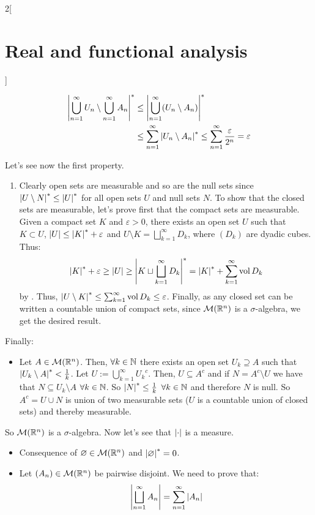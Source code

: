 \documentclass[../../../main_math.tex]{subfiles}
\begin{document}
\begin{multicols}{2}[\section{Real and functional analysis}]
\begin{sproof}
\begin{itemize}
            \begin{align*}
              \om{\bigcup_{n=1}^\infty U_n\setminus\bigcup_{n=1}^\infty A_n} & \leq \om{\bigcup_{n=1}^\infty (U_n\setminus A_n)}                                                      \\
                                                                             & \leq\sum_{n=1}^{\infty}\om{U_n\setminus A_n}\leq\sum_{n=1}^{\infty}\frac{\varepsilon}{2^n}=\varepsilon
            \end{align*}
    \end{itemize}
    Let's see now the first property.
    \begin{enumerate}
      \item Clearly open sets are measurable and so are the null sets since $\om{U\setminus N}\leq\om{U}$ for all open sets $U$ and null sets $N$. To show that the closed sets are measurable, let's prove first that the compact sets are measurable. Given a compact set $K$ and $\varepsilon>0$, there exists an open set $U$ such that $K\subset U$, $\m{U}\leq\om{K}+\varepsilon$ and $U\setminus K=\bigsqcup_{k=1}^\infty D_k$, where $(D_k)$ are dyadic cubes. Thus:
            $$\om{K}+\varepsilon\geq \m{U}\geq\om{K\sqcup\bigsqcup_{k=1}^\infty D_k}=\om{K}+\sum_{k=1}^\infty \vol{D_k}$$
            by . Thus, $\om{U\setminus K}\leq \sum_{k=1}^\infty \vol{D_k}\leq \varepsilon$. Finally, as any closed set can be written a countable union of compact sets, since $\mathcal{M}(\mathbb{R}^n)$ is a $\sigma$-algebra, we get the desired result.
    \end{enumerate}
    Finally:
    \begin{itemize} \item Let $A\in\mathcal{M}(\mathbb{R}^n)$. Then, $\forall k\in\mathbb{N}$ there exists an open set $U_k\supseteq A$ such that $\om{U_k\setminus A}<\frac{1}{k}$. Let $U:=\bigcup_{k=1}^\infty {U_k}^c$. Then, $U\subseteq A^c$ and if $N=A^c\setminus U$ we have that $N\subseteq U_k\setminus A$ $\forall k\in\mathbb{N}$. So $\om{N}\leq\frac{1}{k}$ $\forall k\in\mathbb{N}$ and therefore $N$ is null. So $A^c = U\cup N$ is union of two measurable sets ($U$ is a countable union of closed sets) and thereby measurable.
    \end{itemize}
    So $\mathcal{M}(\mathbb{R}^n)$ is a $\sigma$-algebra. Now let's see that $\m{\cdot}$ is a measure.
    \begin{itemize}
      \item Consequence of $\varnothing\in\mathcal{M}(\mathbb{R}^n)$ and $\om{\varnothing}=0$.
      \item Let $(A_n)\in\mathcal{M}(\mathbb{R}^n)$ be pairwise disjoint. We need to prove that: $$\m{\bigsqcup_{n=1}^\infty A_n}=\sum_{n=1}^\infty \m{A_n}$$

\end{itemize}
\end{sproof}
\end{multicols}
\end{document}
